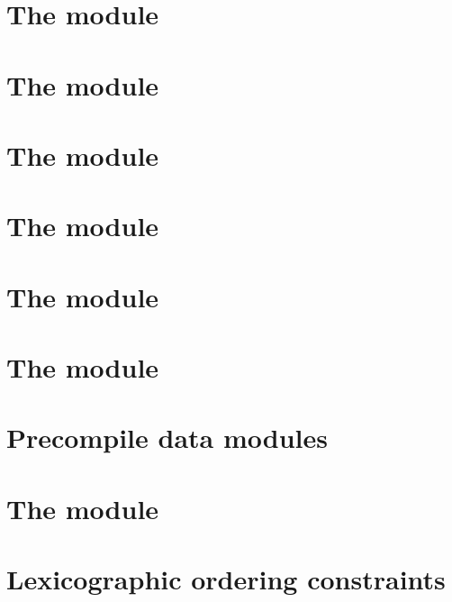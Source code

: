 \documentclass[fleqn]{report}
\begin{document}
\chapter{The \rlpTxnMod{} module}                    \label{chap: txn rlp}         \minitoc    
\chapter{The \txnDataMod{} module}                   \label{chap: txn data}        \minitoc    
\chapter{The \rlpAddrMod{} module}                   \label{chap: addr rlp}        \minitoc    
\chapter{The \rlpTxnRcptMod{} module}                \label{chap: log rlp}         \minitoc    
\chapter{The \logInfoMod{} module}                   \label{chap: log info}        \minitoc    
\chapter{The \logDataMod{} module}                   \label{chap: log data}        \minitoc    
\chapter{Precompile data modules}                    \label{chap: precompile data} \minitoc    
\chapter{The \rlpUtils{} module}                     \label{chap: rlp utils}       \minitoc    


\appendix
\chapter{Lexicographic ordering constraints}         \label{chap: lex}             \minitoc    
\end{document}
